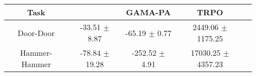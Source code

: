 

\begin{tabular}{ccccc}
  \toprule
  \textbf{Task} & \textbf{\DAIL{}}   & \textbf{GAMA-PA} \cite{DAIL_Model_DAIL} & \textbf{TRPO} \cite{RL_TRPO} \\
  \midrule
  Door-Door     & -33.51 $\pm$ 8.87  & -65.19 $\pm$ 0.77                       & 2449.06 $\pm$ 1175.25        \\
  Hammer-Hammer & -78.84 $\pm$ 19.28 & -252.52 $\pm$ 4.91                      & 17030.25 $\pm$ 4357.23       \\
  \bottomrule
\end{tabular}
